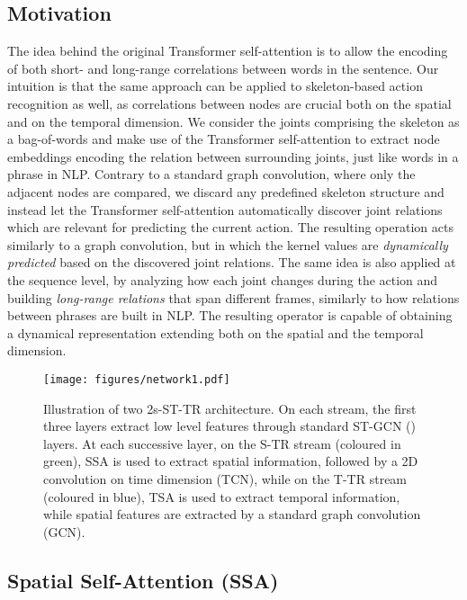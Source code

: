 \documentclass[times,twocolumn,final,authoryear]{elsarticle}
\begin{document}
\subsection{Motivation}
The idea behind the original Transformer self-attention is to allow the encoding of both short- and long-range correlations between words in the sentence. Our intuition is that the same approach can be applied to skeleton-based action recognition as well, as correlations between nodes are crucial both on the spatial and on the temporal dimension. 
We consider the joints comprising the skeleton as a bag-of-words and make use of the Transformer self-attention to extract node embeddings encoding the relation between surrounding joints, just like words in a phrase in NLP. Contrary to a standard graph convolution, where only the adjacent nodes are compared, we discard any predefined skeleton structure and instead let the Transformer self-attention automatically discover joint relations which are relevant for predicting the current action. The resulting operation acts similarly to a graph convolution, but in which the kernel values are \textit{dynamically predicted} based on the discovered joint relations. The same idea is also applied at the sequence level, by analyzing how each joint changes during the action and building \textit{long-range relations} that span different frames, similarly to how relations between phrases are built in NLP. The resulting operator is capable of obtaining a dynamical representation extending both on the spatial and the temporal dimension. 





 
 \begin{figure}
    \centering
    \texttt{[image: figures/network1.pdf]}
    \caption{Illustration of two 2s-ST-TR architecture. On each stream, the first three layers extract low level features through standard ST-GCN (\cite{yan2018spatial}) layers. At each successive layer, on the S-TR stream (coloured in \textcolor{ssa_green}{green}), SSA is used to extract spatial information, followed by a 2D convolution on time dimension (TCN), while on the T-TR stream  (coloured in \textcolor{tsa_blue}{blue}), TSA is used to extract temporal information, while spatial features are extracted by a standard graph convolution (GCN).}
    \label{architecture}
\end{figure}

\subsection{Spatial Self-Attention (SSA)}
\label{sec:ssa-descr}
\end{document}
